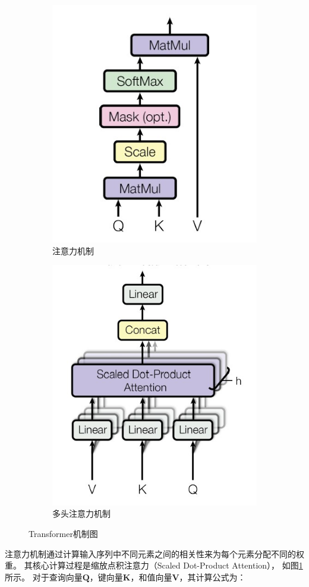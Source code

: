 \begin{figure}[H]
    \centering
    \begin{subfigure}[b]{0.45\textwidth}
        \centering
        \includegraphics[width=0.5\linewidth]{./figures/ScaledDotProductAttention.jpg}
        \caption{注意力机制}
        \label{fig:ScaledDotProductAttention}
    \end{subfigure}
    \hfill
    \begin{subfigure}[b]{0.45\textwidth}
        \centering
        \includegraphics[width=0.5\linewidth]{./figures/MultiHeadAttetion.jpg}
        \caption{多头注意力机制}
        \label{fig:MultiHeadAttetion}
    \end{subfigure}
    \caption{Transformer机制图}
    \label{fig:transformermechanism}
\end{figure}

注意力机制通过计算输入序列中不同元素之间的相关性来为每个元素分配不同的权重。
其核心计算过程是缩放点积注意力（Scaled Dot-Product Attention），
如图\ref{fig:ScaledDotProductAttention}所示。
对于查询向量$\mathbf{Q}$，键向量$\mathbf{K}$，和值向量$\mathbf{V}$，其计算公式为：

